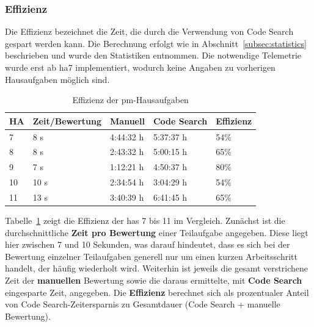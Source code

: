 \subsubsection{Effizienz}

Die Effizienz bezeichnet die Zeit, die durch die Verwendung von Code Search gespart werden kann.
Die Berechnung erfolgt wie in Abschnitt~\ref{subsec:statistics} beschrieben und wurde den Statistiken entnommen.
Die notwendige Telemetrie wurde erst ab \ac{ha}7 implementiert, wodurch keine Angaben zu vorherigen Hausaufgaben möglich sind.

\begin{table}
    \centering
    \caption{Effizienz der \ac{pm}-Hausaufgaben}
    \begin{tabular}{|l|l|l|l|l|}
    \hline
        HA  & Zeit/Bewertung & Manuell & Code Search & Effizienz \\ \hline
        7   &  8 s & 4:44:32 h & 5:37:37 h & 54\% \\ \hline
        8   &  8 s & 2:43:32 h & 5:00:15 h & 65\% \\ \hline
        9   &  7 s & 1:12:21 h & 4:50:37 h & 80\% \\ \hline
        10  & 10 s & 2:34:54 h & 3:04:29 h & 54\% \\ \hline
        11  & 13 s & 3:40:39 h & 6:41:45 h & 65\% \\ \hline
    \end{tabular}
    \label{tbl:pm-efficiency}
\end{table}

Tabelle~\ref{tbl:pm-efficiency} zeigt die Effizienz der \acp{ha} 7 bis 11 im Vergleich.
Zunächst ist die durchschnittliche \textbf{Zeit pro Bewertung} einer Teilaufgabe angegeben.
Diese liegt hier zwischen 7 und 10 Sekunden, was darauf hindeutet, dass es sich bei der Bewertung einzelner Teilaufgaben generell nur um einen kurzen Arbeitsschritt handelt, der häufig wiederholt wird.
Weiterhin ist jeweils die gesamt verstrichene Zeit der \textbf{manuellen} Bewertung sowie die daraus ermittelte, mit \textbf{Code Search} eingesparte Zeit, angegeben.
Die \textbf{Effizienz} berechnet sich als prozentualer Anteil von Code Search-Zeitersparnis zu Gesamtdauer (Code Search + manuelle Bewertung).

